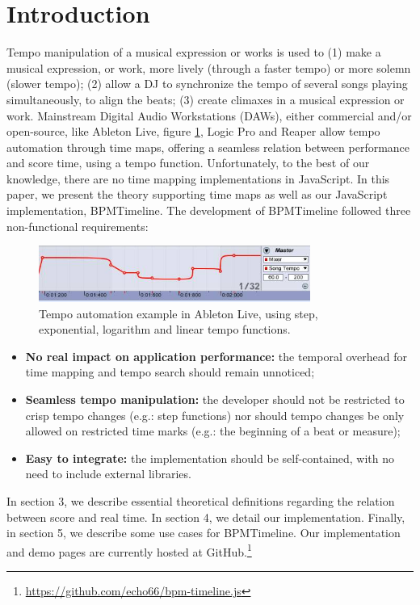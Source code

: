 \documentclass{sig-alternate}
\begin{document}
\section{Introduction}
\begin{sloppypar}
Tempo manipulation of a musical expression or works is used to (1) make a musical expression, or work, more lively (through a faster tempo) or more solemn (slower tempo); (2) allow a DJ to synchronize the tempo of several songs playing simultaneously,  to align the beats; (3) create climaxes in a musical expression or work. Mainstream Digital Audio Workstations (DAWs), either commercial and/or open-source, like Ableton Live, figure \ref{fig:abletonautomation}, Logic Pro and Reaper allow tempo automation through time maps, offering a seamless relation between performance and score time, using a tempo function. Unfortunately, to the best of our knowledge, there are no time mapping implementations in JavaScript. In this paper, we present the theory supporting time maps as well as our JavaScript implementation, BPMTimeline. The development of BPMTimeline followed three non-functional requirements:

\begin{figure}
	\includegraphics[width=3.5in]{ableton-tempo-automation-2.png}
	\caption{Tempo automation example in Ableton Live, using step, exponential, logarithm and linear tempo functions.}
	\label{fig:abletonautomation} 
\end{figure}

\begin{itemize}
	\item \textbf{No real impact on application performance:} the temporal overhead for time mapping and tempo search should remain unnoticed;

	\item \textbf{Seamless tempo manipulation:} the developer should not be restricted to crisp tempo changes (e.g.: step functions) nor should tempo changes be only allowed on restricted time marks (e.g.: the beginning of a beat or measure);

	\item \textbf{Easy to integrate:} the implementation should be self-contained, with no need to include external libraries.
\end{itemize}

In section 3, we describe essential theoretical definitions regarding the relation between score and real time. In section 4, we detail our implementation. Finally, in section 5, we describe some use cases for BPMTimeline. Our implementation and demo pages are currently hosted at GitHub.\footnote{\url{https://github.com/echo66/bpm-timeline.js}}

\end{sloppypar}
\end{document}
